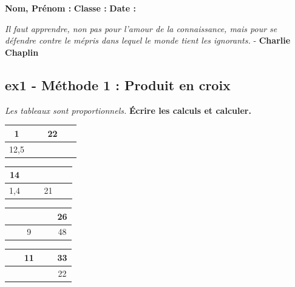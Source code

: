 \documentclass[11pt]{article}
\begin{document}
\newpage


\textbf{Nom, Prénom :} \hspace{8cm} \textbf{Classe :} \hspace{3cm} \textbf{Date :}\\

\begin{center}
  \textit{Il faut apprendre, non pas pour l'amour de la connaissance, mais pour se défendre contre le mépris dans lequel le monde tient les ignorants.}  - \textbf{Charlie Chaplin}
\end{center}

\subsection*{ex1 - Méthode 1 : Produit en croix}
\textit{Les tableaux sont proportionnels.} \newline
\textbf{Écrire les calculs et calculer.}

\begin{multicols}{4}\noindent
  \begin{center}
    \begin{tabular}{|c|c|}
      \hline
      1 & 22\\  \hline
      12,5 & $\phantom{azertyuiop}$\\  \hline
    \end{tabular}
  \end{center}
  \Pointilles[1]
  \begin{center}
    \begin{tabular}{|c|c|}
      \hline
      14 & $\phantom{azertyuiop}$\\  \hline
      1,4 & 21\\  \hline
    \end{tabular}
  \end{center}
  \Pointilles[1]
  \begin{center}
    \begin{tabular}{|c|c|}
      \hline
      $\phantom{azertyuiop}$  & 26\\  \hline
      9 & 48\\  \hline
    \end{tabular}
  \end{center}
  \Pointilles[1]
  \begin{center}
    \begin{tabular}{|c|c|}
      \hline
      11 & 33\\  \hline
      $\phantom{azertyuiop}$ & 22\\  \hline
    \end{tabular}
  \end{center}
  \Pointilles[1]
\end{multicols}
\end{document}
